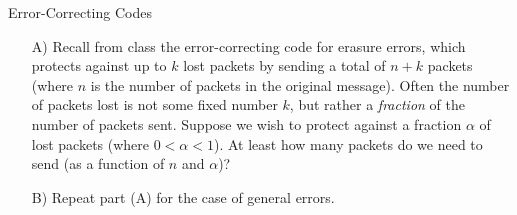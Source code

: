 \begin{homeworkProblem}{Error-Correcting Codes}

    \begin{itemize}
  
        \item[A)] Recall from class the error-correcting code for erasure errors, 
        which protects against up to $k$ lost packets by sending a total of 
        $n+k$ packets (where $n$ is the number of packets in the original 
        message). Often the number of packets lost is not some fixed number $k$, 
        but rather a \emph{fraction} of the number of packets sent. Suppose we 
        wish to protect against a fraction $\alpha$ of lost packets (where 
        $0 < \alpha < 1$). At least how many packets do we need to send (as a 
        function of $n$ and $\alpha$)?

        \item[B)] Repeat part (A) for the case of general errors.

    \end{itemize}

\end{homeworkProblem}
